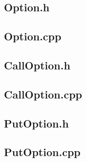 \documentclass[11pt]{article}
\begin{document}
\subsection{Option.h}

\subsection{Option.cpp}


\subsection{CallOption.h}

\subsection{CallOption.cpp}


\subsection{PutOption.h}

\subsection{PutOption.cpp}

\end{document}
